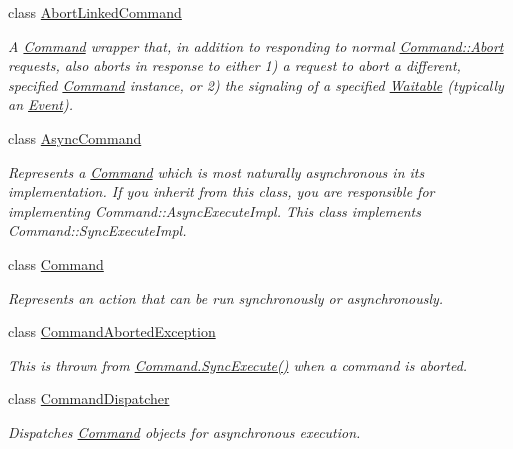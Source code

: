 \begin{DoxyCompactItemize}
\item 
class \mbox{\hyperlink{class_command_lib_1_1_abort_linked_command}{Abort\+Linked\+Command}}
\begin{DoxyCompactList}\small\item\em A \mbox{\hyperlink{class_command_lib_1_1_command}{Command}} wrapper that, in addition to responding to normal \mbox{\hyperlink{class_command_lib_1_1_command_a247cbc7325e3b9d9d7044d449b989aa6}{Command\+::\+Abort}} requests, also aborts in response to either 1) a request to abort a different, specified \mbox{\hyperlink{class_command_lib_1_1_command}{Command}} instance, or 2) the signaling of a specified \mbox{\hyperlink{class_command_lib_1_1_waitable}{Waitable}} (typically an \mbox{\hyperlink{class_command_lib_1_1_event}{Event}}). \end{DoxyCompactList}\item 
class \mbox{\hyperlink{class_command_lib_1_1_async_command}{Async\+Command}}
\begin{DoxyCompactList}\small\item\em Represents a \mbox{\hyperlink{class_command_lib_1_1_command}{Command}} which is most naturally asynchronous in its implementation. If you inherit from this class, you are responsible for implementing Command\+::\+Async\+Execute\+Impl. This class implements Command\+::\+Sync\+Execute\+Impl. \end{DoxyCompactList}\item 
class \mbox{\hyperlink{class_command_lib_1_1_command}{Command}}
\begin{DoxyCompactList}\small\item\em Represents an action that can be run synchronously or asynchronously.\end{DoxyCompactList}\item 
class \mbox{\hyperlink{class_command_lib_1_1_command_aborted_exception}{Command\+Aborted\+Exception}}
\begin{DoxyCompactList}\small\item\em This is thrown from \mbox{\hyperlink{class_command_lib_1_1_command_a5d33760ccb927d7f6349c02907ab4ff3}{Command.\+Sync\+Execute()}} when a command is aborted. \end{DoxyCompactList}\item 
class \mbox{\hyperlink{class_command_lib_1_1_command_dispatcher}{Command\+Dispatcher}}
\begin{DoxyCompactList}\small\item\em Dispatches \mbox{\hyperlink{class_command_lib_1_1_command}{Command}} objects for asynchronous execution. \end{DoxyCompactList}\item 

\end{DoxyCompactItemize}
